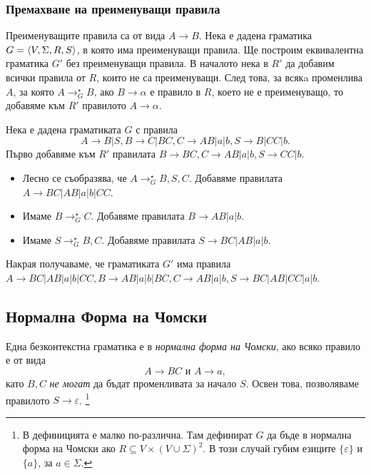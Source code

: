 \subsubsection*{Премахване на преименуващи правила}
Преименуващите правила са от вида $A \to B$.
Нека е дадена граматика $G = \langle{V,\Sigma,R,S}\rangle$, в която има преименуващи правила.
Ще построим еквивалентна граматика $G'$ без преименуващи правила.
В началото нека в $R'$ да добавим всички правила от $R$, които не са преименуващи.
След това, за всякa променлива $A$, за която $A \to^\star_G B$,
ако $B \to \alpha$ е правило в $R$, което не е преименуващо,
то добавяме към $R'$ правилото $A \to \alpha$.

\begin{example}
  Нека е дадена граматиката $G$ с правила  
  \[A\rightarrow B|S,B\rightarrow C|BC,C\rightarrow AB|a|b,S\rightarrow B|CC|b.\]
  Първо добавяме към $R'$ правилата $B \to BC, C \to AB|a|b, S \to CC|b$.
  \begin{itemize}
  \item 
    Лесно се съобразява, че $A \to^\star_G B,S,C$.
    Добавяме правилата $A \to BC|AB|a|b|CC$.
  \item
    Имаме $B \to^\star_G C$.
    Добавяме правилата $B \to AB|a|b$.
  \item
    Имаме $S \to^\star_G B,C$.
    Добавяме правилата $S \to BC|AB|a|b$.
  \end{itemize}
  Накрая получаваме, че граматиката $G'$ има правила
  $A \to BC|AB|a|b|CC, B \to AB|a|b|BC, C \to AB|a|b, S \to BC|AB|CC|a|b$.
\end{example}

\subsection{Нормална Форма на Чомски}

\begin{dfn}
Една безконтекстна граматика е в {\em нормална форма на Чомски}, ако
всяко правило е от вида
\[A \rightarrow BC\mbox{ и }A \rightarrow a,\]
като $B, C$ {\em не могат} да бъдат променливата за начало $S$.
Освен това, позволяваме правилото $S\to\varepsilon$.
\footnote{В \cite[стр. 151]{papadimitriou} дефиницията е малко по-различна.
Там дефинират $G$ да бъде в нормална форма на Чомски ако $R \subseteq V\times(V\cup\Sigma)^2$.
В този случай губим езиците $\{\varepsilon\}$ и $\{a\}$, за $a\in\Sigma$.}
\end{dfn}

